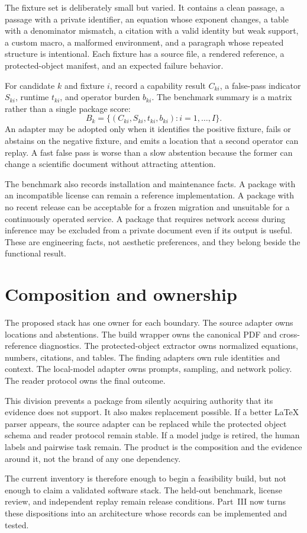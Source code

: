 The fixture set is deliberately small but varied. It contains a clean passage,
a passage with a private identifier, an equation whose exponent changes, a
table with a denominator mismatch, a citation with a valid identity but weak
support, a custom macro, a malformed environment, and a paragraph whose
repeated structure is intentional. Each fixture has a source file, a rendered
reference, a protected-object manifest, and an expected failure behavior.

For candidate $k$ and fixture $i$, record a capability result $C_{ki}$, a
false-pass indicator $S_{ki}$, runtime $t_{ki}$, and operator burden $b_{ki}$.
The benchmark summary is a matrix rather than a single package score:
\begin{equation}
  B_k = \{(C_{ki},S_{ki},t_{ki},b_{ki}): i=1,\ldots,I\}.
  \label{eq:software-benchmark-matrix}
\end{equation}
An adapter may be adopted only when it identifies the positive fixture, fails
or abstains on the negative fixture, and emits a location that a second
operator can replay. A fast false pass is worse than a slow abstention because
the former can change a scientific document without attracting attention.

The benchmark also records installation and maintenance facts. A package with
an incompatible license can remain a reference implementation. A package with
no recent release can be acceptable for a frozen migration and unsuitable for
a continuously operated service. A package that requires network access during
inference may be excluded from a private document even if its output is useful.
These are engineering facts, not aesthetic preferences, and they belong beside
the functional result.

\section{Composition and ownership}
\label{sec:software-composition}

The proposed stack has one owner for each boundary. The source adapter owns
locations and abstentions. The build wrapper owns the canonical PDF and
cross-reference diagnostics. The protected-object extractor owns normalized
equations, numbers, citations, and tables. The finding adapters own rule
identities and context. The local-model adapter owns prompts, sampling, and
network policy. The reader protocol owns the final outcome.

This division prevents a package from silently acquiring authority that its
evidence does not support. It also makes replacement possible. If a better
LaTeX parser appears, the source adapter can be replaced while the protected
object schema and reader protocol remain stable. If a model judge is retired,
the human labels and pairwise task remain. The product is the composition and
the evidence around it, not the brand of any one dependency.

The current inventory is therefore enough to begin a feasibility build, but not
enough to claim a validated software stack. The held-out benchmark, license
review, and independent replay remain release conditions. Part~III now turns
these dispositions into an architecture whose records can be implemented and
tested.
